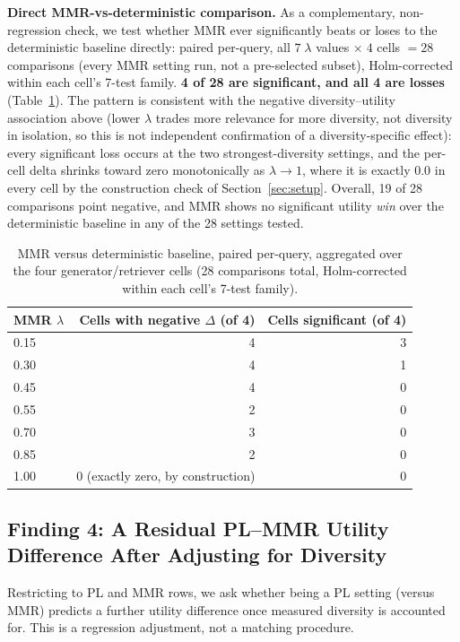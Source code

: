 \documentclass[11pt]{article}
\begin{document}
\textbf{Direct MMR-vs-deterministic comparison.} As a complementary,
non-regression check, we test whether MMR ever significantly beats or
loses to the deterministic baseline directly: paired per-query, all
$7\;\lambda$ values $\times\;4$ cells $=28$ comparisons (every MMR setting
run, not a pre-selected subset), Holm-corrected within each cell's 7-test
family. \textbf{4 of 28 are significant, and all 4 are losses}
(Table~\ref{tab:mmr-vs-det}). The pattern is consistent with the negative
diversity--utility association above (lower $\lambda$ trades more
relevance for more diversity, not diversity in isolation, so this is not
independent confirmation of a diversity-specific effect): every
significant loss occurs at the two strongest-diversity settings, and the
per-cell delta shrinks toward zero monotonically as $\lambda\to1$, where
it is exactly 0.0 in every cell by the construction check of
Section~\ref{sec:setup}. Overall, 19 of 28 comparisons point negative, and
MMR shows no significant utility \emph{win} over the deterministic
baseline in any of the 28 settings tested.

\begin{table}[htbp]
\centering
\caption{MMR versus deterministic baseline, paired per-query, aggregated
over the four generator/retriever cells (28 comparisons total,
Holm-corrected within each cell's 7-test family).}
\label{tab:mmr-vs-det}
\begin{tabular}{lrr}
\toprule
MMR $\lambda$ & Cells with negative $\Delta$ (of 4) & Cells significant (of 4) \\
\midrule
0.15 & 4 & 3 \\
0.30 & 4 & 1 \\
0.45 & 4 & 0 \\
0.55 & 2 & 0 \\
0.70 & 3 & 0 \\
0.85 & 2 & 0 \\
1.00 & 0 (exactly zero, by construction) & 0 \\
\bottomrule
\end{tabular}
\end{table}

\subsection{Finding 4: A Residual PL--MMR Utility Difference After Adjusting for Diversity}
\label{sec:finding4}

Restricting to PL and MMR rows, we ask whether being a PL setting (versus
MMR) predicts a further utility difference once measured diversity is
accounted for. This is a regression adjustment, not a matching procedure.
\end{document}

